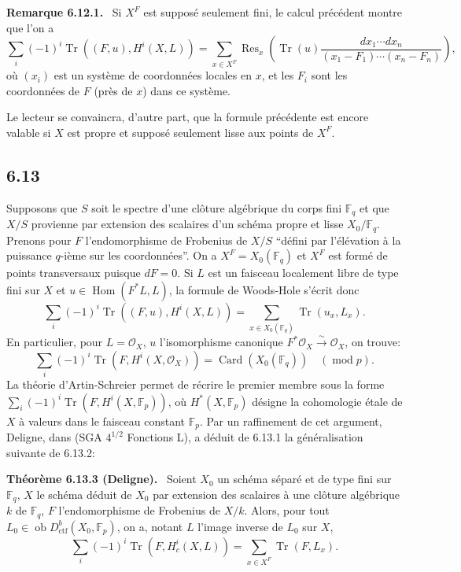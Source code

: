 \documentclass[11pt]{article}
\newenvironment{statement}[1]{\par\medskip\noindent\textbf{#1.}\ }{\par\medskip}
\DeclareMathOperator{\Hom}{Hom}
\newcommand{\ob}{\operatorname{ob}}
\providecommand{\ctf}{\mathrm{ctf}}
\providecommand{\OO}{\mathcal{O}}
\providecommand{\Hom}{\operatorname{Hom}}
\providecommand{\ob}{\operatorname{ob}}
\begin{document}
\begin{statement}{Remarque 6.12.1}
Si $X^F$ est supposé seulement fini, le calcul précédent montre que l'on a
\[
\sum_i(-1)^i\operatorname{Tr}((F,u),H^i(X,L))=
\sum_{x\in X^F}\operatorname{Res}_x\left(\operatorname{Tr}(u)\frac{dx_1\cdots dx_n}{(x_1-F_1)\cdots(x_n-F_n)}\right),
\]
où $(x_i)$ est un système de coordonnées locales en $x$, et les $F_i$ sont les coordonnées de $F$ (près de $x$) dans ce système.

Le lecteur se convaincra, d'autre part, que la formule précédente est encore valable si $X$ est propre et supposé seulement lisse aux points de $X^F$.
\end{statement}

\subsection*{6.13}
Supposons que $S$ soit le spectre d'une clôture algébrique du corps fini $\mathbb F_q$ et que $X/S$ provienne par extension des scalaires d'un schéma propre et lisse $X_0/\mathbb F_q$. Prenons pour $F$ l'endomorphisme de Frobenius de $X/S$ ``défini par l'élévation à la puissance $q$-ième sur les coordonnées''. On a $X^F=X_0(\mathbb F_q)$ et $X^F$ est formé de points transversaux puisque $dF=0$. Si $L$ est un faisceau localement libre de type fini sur $X$ et $u\in\Hom(F^*L,L)$, la formule de Woods-Hole s'écrit donc
\begin{equation}
\tag{6.13.1}
\sum_i(-1)^i\operatorname{Tr}((F,u),H^i(X,L))=
\sum_{x\in X_0(\mathbb F_q)}\operatorname{Tr}(u_x,L_x).
\end{equation}
En particulier, pour $L=\OO_X$, $u$ l'isomorphisme canonique $F^*\OO_X\xrightarrow{\sim}\OO_X$, on trouve:
\begin{equation}
\tag{6.13.2}
\sum_i(-1)^i\operatorname{Tr}(F,H^i(X,\OO_X))=\operatorname{Card}(X_0(\mathbb F_q))\quad(\operatorname{mod} p).
\end{equation}
La théorie d'Artin-Schreier permet de récrire le premier membre sous la forme $\sum_i(-1)^i\operatorname{Tr}(F,H^i(X,\mathbb F_p))$, où $H^*(X,\mathbb F_p)$ désigne la cohomologie étale de $X$ à valeurs dans le faisceau constant $\mathbb F_p$. Par un raffinement de cet argument, Deligne, dans (SGA $4^{1/2}$ Fonctions L), a déduit de 6.13.1 la généralisation suivante de 6.13.2:


\begin{statement}{Théorème 6.13.3 (Deligne)}
Soient $X_0$ un schéma séparé et de type fini sur $\mathbb F_q$, $X$ le schéma déduit de $X_0$ par extension des scalaires à une clôture algébrique $k$ de $\mathbb F_q$, $F$ l'endomorphisme de Frobenius de $X/k$. Alors, pour tout $L_0\in\ob D^b_{\ctf}(X_0,\mathbb F_p)$, on a, notant $L$ l'image inverse de $L_0$ sur $X$,
\[
\sum_i(-1)^i\operatorname{Tr}(F,H_c^i(X,L))=
\sum_{x\in X^F}\operatorname{Tr}(F,L_x).
\]
\end{statement}
\end{document}
